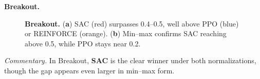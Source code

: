 \noindent \textbf{Breakout.}
\begin{figure} 
	\centering
	\quad
	\caption{\textbf{Breakout.}
		(\textbf{a}) SAC (red) surpasses 0.4--0.5, well above PPO (blue) or REINFORCE (orange).
		(\textbf{b}) Min--max confirms SAC reaching above 0.5, while PPO stays near 0.2.}
	\label{fig:breakout_combined}
\end{figure}

\noindent
\emph{Commentary.} In Breakout, \textbf{SAC} is the clear winner under both normalizations, though the gap appears even larger in min--max form.

\medskip

